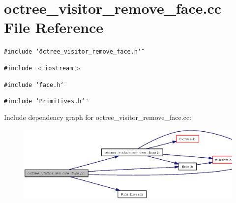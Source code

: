 \section{octree\_\-visitor\_\-remove\_\-face.cc File Reference}
\label{octree__visitor__remove__face_8cc}
{\tt \#include \char`\"{}octree\_\-visitor\_\-remove\_\-face.h\char`\"{}}\par
{\tt \#include $<$iostream$>$}\par
{\tt \#include \char`\"{}face.h\char`\"{}}\par
{\tt \#include \char`\"{}Primitives.h\char`\"{}}\par


Include dependency graph for octree\_\-visitor\_\-remove\_\-face.cc:\begin{figure}[H]
\begin{center}
\leavevmode
\includegraphics[width=366pt]{octree__visitor__remove__face_8cc__incl}
\end{center}
\end{figure}
